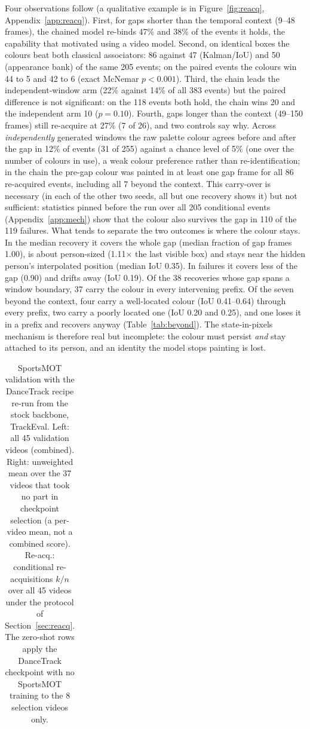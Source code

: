 \documentclass{article} %
\newcommand{\rev}[1]{{\color{blue}#1}}
\begin{document}
Four observations follow (a qualitative example is in Figure~\ref{fig:reacq},
Appendix~\ref{app:reacq}). First, for gaps shorter than the temporal context (9--48 frames),
the chained model re-binds 47\% and 38\% of
the events it holds, the capability that motivated using a video model. Second, on
identical boxes the colours beat both classical associators: 86 against 47 (Kalman/IoU) and
50 (appearance bank) of the same 205 events; on the paired events the colours win \rev{44} to 5
and \rev{42} to 6 (exact McNemar $p<0.001$). Third, the chain leads the independent-window arm
(22\% against 14\% of all 383 events) but the paired difference is not significant: on the
\rev{118} events both hold, the chain wins 20 and the independent arm 10 ($p=0.10$). Fourth, gaps
longer than the context (49--150 frames) still re-acquire at 27\% (7 of 26), and two
controls say why. Across \emph{independently} generated windows the raw palette colour
agrees before and after the gap in 12\% of events (31 of 255) against a chance level of 5\%
(one over the number of colours in use), a weak colour preference rather than
re-identification; in the chain the pre-gap colour was painted in at least one gap frame for
all 86 re-acquired events, including all 7 beyond the context. \rev{This carry-over is
necessary (in each of the other two seeds, all but one recovery shows it) but not
sufficient: statistics pinned before the run over all 205
conditional events (Appendix~\ref{app:mech}) show that the colour also survives the gap in
110 of the 119 failures. What tends to separate the two outcomes is where the colour stays. In the median recovery it
covers the whole gap (median fraction of gap frames 1.00), is about person-sized (1.11$\times$
the last visible box) and stays near the hidden person's interpolated position (median IoU
0.35). In failures it covers less of the gap (0.90) and drifts away (IoU 0.19). Of the 38
recoveries whose gap spans a window boundary, 37 carry the colour in every intervening
prefix. Of the seven beyond the context, four carry a well-located colour (IoU 0.41--0.64)
through every prefix, two carry a poorly located one (IoU 0.20 and 0.25), and one loses it
in a prefix and recovers anyway (Table~\ref{tab:beyond}). The state-in-pixels mechanism is therefore real
but incomplete: the colour must persist \emph{and} stay attached to its person, and an
identity the model stops painting is lost.}


\begin{table}[t]
\centering
\scriptsize
\setlength{\tabcolsep}{3pt}
\caption{SportsMOT validation with the DanceTrack recipe re-run from the stock backbone,
TrackEval. Left: all 45 validation videos (combined). Right: unweighted mean over the 37
videos that took no part in checkpoint selection (a per-video mean, not a combined score).
Re-acq.: conditional re-acquisitions $k/n$ over all 45 videos under the protocol of
Section~\ref{sec:reacq}.
The zero-shot rows apply the DanceTrack checkpoint with no SportsMOT training to the 8
selection videos only.}
\label{tab:sportsmot}
\begin{tabular}{lccccccccc}
\toprule

\end{tabular}
\end{table}
\end{document}
